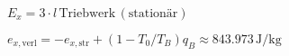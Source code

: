 \( E_x = 3 \cdot l \, \text{Triebwerk} \, (\text{stationär}) \)  

\( e_{x,\text{verl}} = -e_{x,\text{str}} + (1 - T_0 / T_B) q_B \approx 843.973 \, \text{J/kg} \)